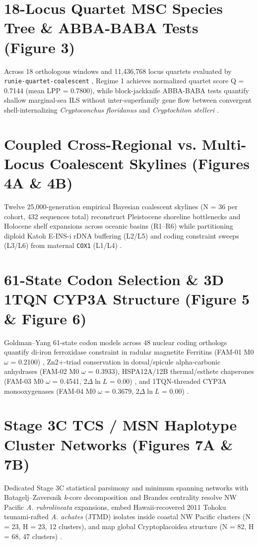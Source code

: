 \documentclass[11pt]{article}
\begin{document}
\section{18-Locus Quartet MSC Species Tree \& ABBA-BABA Tests (Figure 3)}
Across 18 orthologous windows and 11,436,768 locus quartets evaluated by \texttt{runie-quartet-coalescent} \cite{ref23}, Regime 1 achieves normalized quartet score Q = 0.7144 (mean LPP = 0.7800), while block-jackknife ABBA-BABA tests \cite{ref26} quantify shallow marginal-sea ILS without inter-superfamily gene flow between convergent shell-internalizing \emph{Cryptoconchus floridanus} and \emph{Cryptochiton stelleri} \cite{ref3,ref4}.

\section{Coupled Cross-Regional vs. Multi-Locus Coalescent Skylines (Figures 4A \& 4B)}
Twelve 25,000-generation empirical Bayesian coalescent skylines (N = 36 per cohort, 432 sequences total) reconstruct Pleistocene shoreline bottlenecks and Holocene shelf expansions across oceanic basins (R1--R6) while partitioning diploid Katoh E-INS-i rDNA buffering (L2/L5) and coding constraint sweeps (L3/L6) from maternal \texttt{COX1} (L1/L4) \cite{ref12,ref20,ref24}.

\section{61-State Codon Selection \& 3D 1TQN CYP3A Structure (Figure 5 \& Figure 6)}
Goldman--Yang 61-state codon models \cite{ref25} across 48 nuclear coding orthologs quantify di-iron ferroxidase constraint in radular magnetite Ferritins (FAM-01 M0 $\omega$ = 0.2100) \cite{ref15,ref16}, Zn2+-triad conservation in dorsal/spicule alpha-carbonic anhydrases (FAM-02 M0 $\omega$ = 0.3933), HSPA12A/12B thermal/esthete chaperones (FAM-03 M0 $\omega$ = 0.4541, 2$\Delta\ln L$ = 0.00) \cite{ref13,ref14}, and 1TQN-threaded CYP3A monooxygenases (FAM-04 M0 $\omega$ = 0.3679, 2$\Delta\ln L$ = 0.00) \cite{ref27}.

\section{Stage 3C TCS / MSN Haplotype Cluster Networks (Figures 7A \& 7B)}
Dedicated Stage 3C statistical parsimony and minimum spanning networks with Batagelj--Zaversnik \emph{k}-core decomposition and Brandes centrality \cite{ref17,ref18,ref19} resolve NW Pacific \emph{A. rubrolineata} expansions, embed Hawaii-recovered 2011 Tohoku tsunami-rafted \emph{A. achates} (JTMD) isolates inside coastal NW Pacific clusters (N = 23, H = 23, 12 clusters), and map global Cryptoplacoidea structure (N = 82, H = 68, 47 clusters) \cite{ref4,ref9,ref12}.
\end{document}
